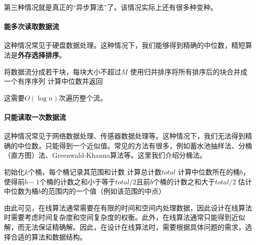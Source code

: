 第三种情况就是真正的“异步算法”了。该情况实际上还有很多种变种。

\paragraph{能多次读取数据流} 这种情况常见于硬盘数据处理。这种情况下，我们能够得到精确的中位数，精短算法是\textbf{外存选择排序}。
\begin{algorithm}
    \caption{外存选择排序法}
    将数据流分成若干块，每块大小不超过$M$\;
    使用归并排序将所有排序后的块合并成一个有序序列\;
    计算中位数并返回\;
\end{algorithm}
这需要$O(\log n)$次遍历整个流。

\paragraph{只能读取一次数据流} 这种情况常见于网络数据处理、传感器数据处理等。这种情况下，我们无法得到精确的中位数，只能得到一个近似值。常见的方法有很多，例如蓄水池抽样法、分桶（直方图）法、Greenwald-Khanna算法等。这里我们介绍分桶法。
\begin{algorithm}
    \caption{分桶法}
    初始化$k$个桶，每个桶记录其范围和计数\;
    计算总计数$total$\;
    计算中位数所在的桶$b$，使得前$b-1$个桶的计数之和小于等于$total/2$且前$b$个桶的计数之和大于$total/2$\;
    估计中位数为桶$b$的范围内的一个值（例如该范围的中点）\;
    \;
\end{algorithm}

由此可见，在线算法通常需要在有限的时间和空间内处理数据，因此设计在线算法时需要考虑时间复杂度和空间复杂度的权衡。此外，在线算法通常只能得到近似解，而无法保证精确解。因此，在设计在线算法时，需要根据具体问题的需求，选择合适的算法和数据结构。